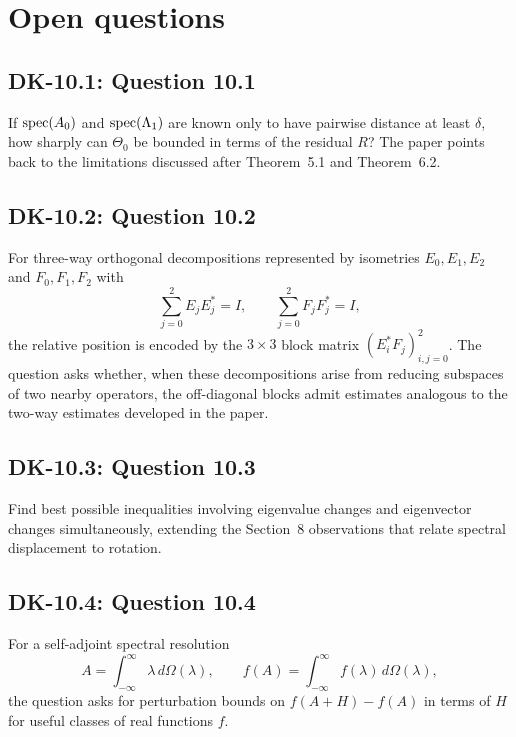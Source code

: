 \section{Open questions}

\subsection*{DK-10.1: Question 10.1}
If $\operatorname{spec}(A_0)$ and $\operatorname{spec}(\Lambda_1)$ are known only to have pairwise distance at least $\delta$, how sharply can $\Theta_0$ be bounded in terms of the residual $R$?  The paper points back to the limitations discussed after Theorem~5.1 and Theorem~6.2.

\subsection*{DK-10.2: Question 10.2}
For three-way orthogonal decompositions represented by isometries $E_0,E_1,E_2$ and $F_0,F_1,F_2$ with
\[
 \sum_{j=0}^2E_jE_j^*=I,
 \qquad
 \sum_{j=0}^2F_jF_j^*=I,
\]
the relative position is encoded by the $3\times3$ block matrix $(E_i^*F_j)_{i,j=0}^2$.  The question asks whether, when these decompositions arise from reducing subspaces of two nearby operators, the off-diagonal blocks admit estimates analogous to the two-way estimates developed in the paper.

\subsection*{DK-10.3: Question 10.3}
Find best possible inequalities involving eigenvalue changes and eigenvector changes simultaneously, extending the Section~8 observations that relate spectral displacement to rotation.

\subsection*{DK-10.4: Question 10.4}
For a self-adjoint spectral resolution
\[
 A=\int_{-\infty}^{\infty}\lambda\,d\Omega(\lambda),
 \qquad
 f(A)=\int_{-\infty}^{\infty}f(\lambda)\,d\Omega(\lambda),
\]
the question asks for perturbation bounds on $f(A+H)-f(A)$ in terms of $H$ for useful classes of real functions $f$.

